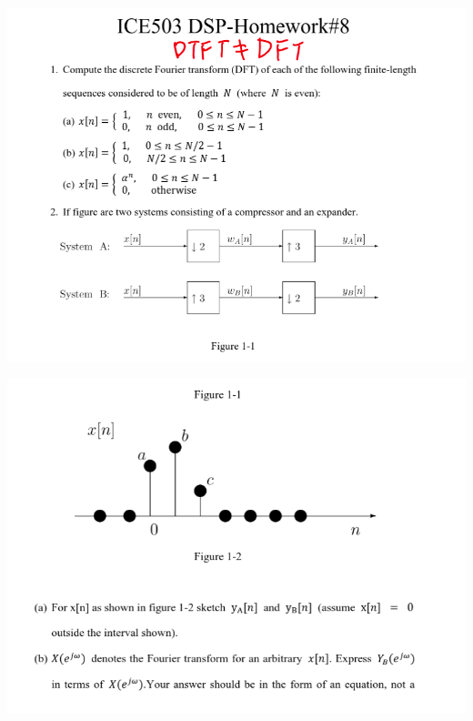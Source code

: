 \documentclass[a4paper]{article}
\begin{document}
\begin{center}
	\includegraphics[width=1\linewidth]{screenshot073}
\end{center}

	
	\begin{center}
		\includegraphics[width=1\linewidth]{screenshot074}
	\end{center}
	
	
	
\end{document}
